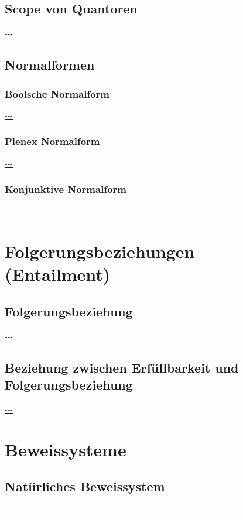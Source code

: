 \documentclass[twocolumn]{article}
\begin{document}
    \subsection{Scope von Quantoren}
    \url{---}\\

    \subsection{Normalformen}

    \subsubsection{Boolsche Normalform}
    \url{---}\\

    \subsubsection{Plenex Normalform}
    \url{---}\\

    \subsubsection{Konjunktive Normalform}
    \url{---}\\

    \section{Folgerungsbeziehungen (Entailment)}

    \subsection{Folgerungsbeziehung}
    \url{---}\\

    \subsection{Beziehung zwischen Erfüllbarkeit und Folgerungsbeziehung}
    \url{---}\\

    \section{Beweissysteme}

    \subsection{Natürliches Beweissystem}
    \url{---}\\
\end{document}
